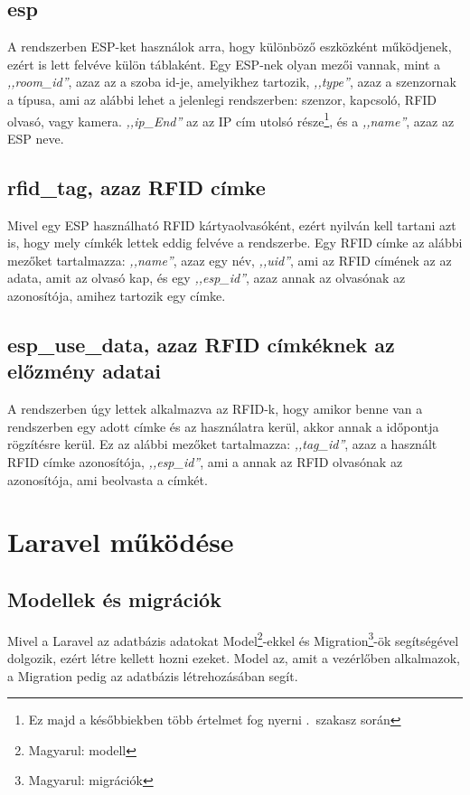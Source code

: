 \documentclass[
]{thesis-ekf}
\theoremstyle{definition}
\theoremstyle{remark}
\begin{document}
	\subsection*{esp}
	A rendszerben ESP-ket használok arra, hogy különböző eszközként működjenek, ezért is lett felvéve külön táblaként. Egy ESP-nek olyan mezői vannak, mint a \emph{,,room\_id''}, azaz az a szoba id-je, amelyikhez tartozik, \emph{,,type''}, azaz a szenzornak a típusa, ami az alábbi lehet a jelenlegi rendszerben: szenzor, kapcsoló, RFID olvasó, vagy kamera.  \emph{,,ip\_End''} az az IP cím utolsó része\footnote{Ez majd a későbbiekben több értelmet fog nyerni .~szakasz során}, és a \emph{,,name''}, azaz az ESP neve.
	
	\subsection*{rfid\_tag, azaz RFID címke}
	Mivel egy ESP használható RFID kártyaolvasóként, ezért nyilván kell tartani azt is, hogy mely címkék lettek eddig felvéve a rendszerbe. Egy RFID címke az alábbi mezőket tartalmazza: \emph{,,name''}, azaz egy név, \emph{,,uid''}, ami az RFID címének az az adata, amit az olvasó kap, és egy \emph{,,esp\_id''}, azaz annak az olvasónak az azonosítója, amihez tartozik egy címke.
	
	\subsection*{esp\_use\_data, azaz RFID címkéknek az előzmény adatai}
	A rendszerben úgy lettek alkalmazva az RFID-k, hogy amikor benne van a rendszerben egy adott címke és az használatra kerül, akkor annak a időpontja rögzítésre kerül. Ez az alábbi mezőket tartalmazza: \emph{,,tag\_id''}, azaz a használt RFID címke azonosítója, \emph{,,esp\_id''}, ami a annak az RFID olvasónak az azonosítója, ami beolvasta a címkét.
	
	\section{Laravel működése}
	
	\subsection{Modellek és migrációk}
	Mivel a Laravel az adatbázis adatokat Model\footnote{Magyarul: modell}-ekkel és Migration\footnote{Magyarul: migrációk}-ök segítségével dolgozik, ezért létre kellett hozni ezeket. 
	Model az, amit a vezérlőben alkalmazok, a Migration pedig az adatbázis létrehozásában segít.\cite{laravel-model}
	
\end{document}
